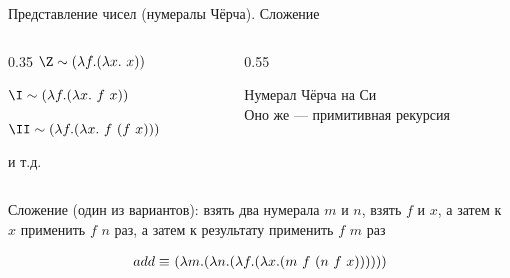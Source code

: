 \begin{frame}{Представление чисел (нумералы Чёрча). Сложение}

\begin{columns}[T]
    \begin{column}{0.35\textwidth}
$ \Z \sim \lam{f}{\lam{x}{\ x}}$

$ \I \sim \lam{f}{\lam{x}{\ f\ x}}$

$ \II \sim \lam{f}{\lam{x}{\ f\ (f\ x)}}$

  и т.д.
    \end{column}
    \begin{column}{0.55\textwidth}
    \begin{minipage}{\textwidth}
    Нумерал Чёрча на Си\\
    Оно же --- примитивная рекурсия
    \numeralIsFor
    \end{minipage}
    \end{column}
\end{columns}

  \vspace{2em}

  Сложение (один из вариантов): взять два нумерала $m$ и $n$, взять $f$ и $x$, а затем к $x$ применить $f$ $n$ раз, а затем к результату применить $f$ $m$ раз

{\Large \begin{align*}
add \equiv &\ (\lambda m . (\lambda n . (\lambda f . (\lambda x . (m\ f\  (n\ f\  x))))))\\
\end{align*}}
\end{frame}

